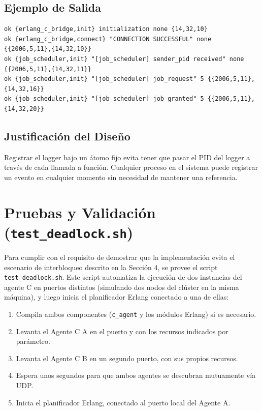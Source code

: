 \documentclass[12pt,a4paper]{article}
\begin{document}
\subsection{Ejemplo de Salida}

\begin{lstlisting}
ok {erlang_c_bridge,init} initialization none {14,32,10}
ok {erlang_c_bridge,connect} "CONNECTION SUCCESSFUL" none {{2006,5,11},{14,32,10}}
ok {job_scheduler,init} "[job_scheduler] sender_pid received" none {{2006,5,11},{14,32,11}}
ok {job_scheduler,init} "[job_scheduler] job_request" 5 {{2006,5,11},{14,32,16}}
ok {job_scheduler,init} "[job_scheduler] job_granted" 5 {{2006,5,11},{14,32,20}}
\end{lstlisting}

\subsection{Justificación del Diseño}

Registrar el logger bajo un átomo fijo evita tener que pasar el PID del logger a través de cada llamada a función. Cualquier proceso en el sistema puede registrar un evento en cualquier momento sin necesidad de mantener una referencia.

\section{Pruebas y Validación (\texttt{test\_deadlock.sh})}

Para cumplir con el requisito de demostrar que la implementación evita el escenario de interbloqueo descrito en la Sección 4, se provee el script \texttt{test\_deadlock.sh}. Este script automatiza la ejecución de dos instancias del agente C en puertos distintos (simulando dos nodos del clúster en la misma máquina), y luego inicia el planificador Erlang conectado a una de ellas:

\begin{enumerate}
    \item Compila ambos componentes (\texttt{c\_agent} y los módulos Erlang) si es necesario.
    \item Levanta el Agente C A en el puerto y con los recursos indicados por parámetro.
    \item Levanta el Agente C B en un segundo puerto, con sus propios recursos.
    \item Espera unos segundos para que ambos agentes se descubran mutuamente vía UDP.
    \item Inicia el planificador Erlang, conectado al puerto local del Agente A.
\end{enumerate}
\end{document}
